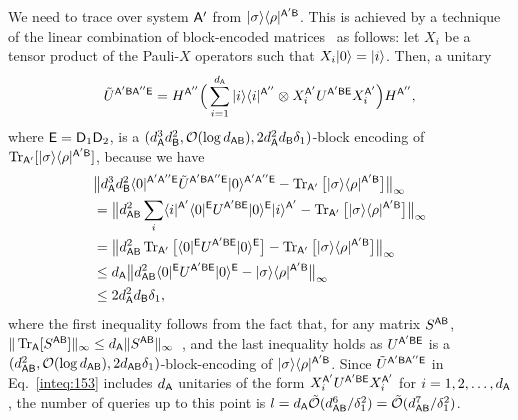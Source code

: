 We need to trace over system $\sA'$ from $\ketbra{\sigma}{\rho}^{\sA'\sB}$.
This is achieved by a technique of the linear combination of block-encoded matrices~\cite{gilyen2019qsvt, Gilyn2019thesis} as follows: let $X_i$ be a tensor product of the Pauli-$X$ operators such that $X_i\ket{0} = \ket{i}$.
Then, a unitary
\begin{align}
\label{inteq:153}
    \til{U}^{\sA'\sB\sA''\sE} =  H^{\sA''}\Big(\sum_{i=1}^{d_\sA} \ketbra{i}{i}^{\sA''} \otimes X_i^{\sA'} U^{\sA'\sB\sE} X_i^{\sA'}\Big)H^{\sA''}, 
\end{align}
where $\sE = \sD_1\sD_2$, is a $(d_\sA^3d_\sB^2, \cO(\log{d_{\sA\sB}}), 2d_\sA^2 d_\sB\delta_1)$-block encoding of $\tr_{\sA'}[\ketbra{\sigma}{\rho}^{\sA'\sB}]$, because we have
\begin{align}
    &\big\|d_\sA^3 d_\sB^2 \bra{0}^{\sA'\sA''\sE} \til{U}^{\sA'\sB\sA''\sE} \ket{0}^{\sA'\sA''\sE} - \tr_{\sA'}\big[\ketbra{\sigma}{\rho}^{\sA'\sB}\big]\big\|_\infty \notag\\
    &= \big\|d_{\sA\sB}^2\sum_i\bra{i}^{\sA'}\bra{0}^\sE U^{\sA'\sB\sE}\ket{0}^\sE\ket{i}^{\sA'} - \tr_{\sA'}\big[\ketbra{\sigma}{\rho}^{\sA'\sB}\big]\big\|_\infty \\
    &= \big\|d_{\sA\sB}^2\tr_{\sA'}\big[\bra{0}^\sE U^{\sA'\sB\sE} \ket{0}^\sE\big]- \tr_{\sA'}\big[\ketbra{\sigma}{\rho}^{\sA'\sB}\big]\big\|_\infty \\
    &\leq d_\sA\big\|d_{\sA\sB}^2\bra{0}^\sE U^{\sA'\sB\sE} \ket{0}^\sE - \ketbra{\sigma}{\rho}^{\sA'\sB}\big\|_\infty \\
    \label{inteq:124}
    &\leq 2d_\sA^2 d_\sB\delta_1,
\end{align}
where the first inequality follows from the fact that, for any matrix $S^{\sA\sB}$, $\|\tr_\sA[S^{\sA\sB}]\|_\infty \leq d_\sA\|S^{\sA\sB}\|_\infty$~\cite{rastegin2012NormPartialTrace}, and the last inequality holds as $U^{\sA'\sB\sE}$ is a $(d_{\sA\sB}^2, \cO(\log{d_{\sA\sB}}), 2d_{\sA\sB}\delta_1)$-block-encoding of $\ketbra{\sigma}{\rho}^{\sA'\sB}$.
Since $\til{U}^{\sA'\sB\sA''\sE}$ in Eq.~\eqref{inteq:153} includes $d_\sA$ unitaries of the form $X_i^{\sA'} U^{\sA'\sB\sE} X_i^{\sA'}$ for $i = 1, 2, \ldots, d_\sA$, the number of queries up to this point is $l = d_\sA \til{\cO}(d_{\sA\sB}^6/\delta_1^2) = \til{\cO}(d_{\sA\sB}^7/\delta_1^2)$.

